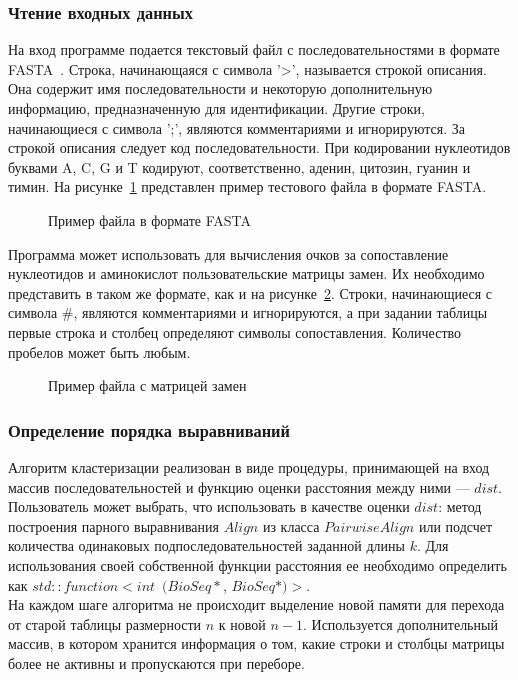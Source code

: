 \subsubsection[Чтение входных данных]{\large Чтение входных данных}
\hspace{\parindent} На вход программе подается текстовый файл с последовательностями в формате FASTA~\cite{FASTAformat}. Строка, начинающаяся с символа '>', называется строкой описания. Она содержит имя последовательности и некоторую дополнительную информацию, предназначенную для идентификации. Другие строки, начинающиеся с символа ';', являются комментариями и игнорируются. За строкой описания следует код последовательности. При кодировании нуклеотидов буквами A, C, G и T кодируют, соответственно, аденин, цитозин, гуанин и тимин. На рисунке~\ref{ris:FASTAexample} представлен пример тестового файла в формате FASTA.
\begin{figure}[H]
	\caption{Пример файла в формате FASTA}
	\label{ris:FASTAexample}
\end{figure}

Программа может использовать для вычисления очков за сопоставление нуклеотидов и аминокислот пользовательские матрицы замен. Их необходимо представить в таком же формате, как и на рисунке~\ref{ris:BLOSUM62}.
Строки, начинающиеся с символа $\#$, являются комментариями и игнорируются, а при задании таблицы первые строка и столбец определяют символы сопоставления. Количество пробелов может быть любым.

\begin{figure}[h]
	\caption{Пример файла с матрицей замен}
	\label{ris:BLOSUM62}
\end{figure}

\subsubsection[Определение порядка выравниваний]{\large Определение порядка выравниваний}
\hspace{\parindent} Алгоритм кластеризации реализован в виде процедуры, принимающей на вход массив последовательностей и функцию оценки расстояния между ними --- $dist$. Пользователь может выбрать, что использовать в качестве оценки $dist$: метод построения парного выравнивания $Align$ из класса $PairwiseAlign$ или подсчет количества одинаковых подпоследовательностей заданной длины $k$. Для использования своей собственной функции расстояния ее необходимо определить как $std::function<int$~$(BioSeq*$, $BioSeq*)>$. \\
\indent На каждом шаге алгоритма не происходит выделение новой памяти для перехода от старой таблицы размерности $n$ к новой $n-1$. Используется дополнительный массив, в котором хранится информация о том, какие строки и столбцы матрицы более не активны и пропускаются при переборе. 

